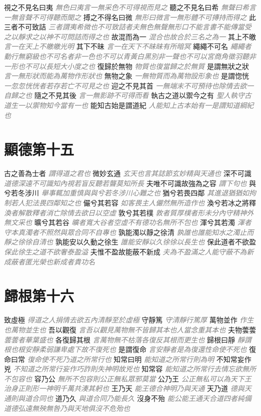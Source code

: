 \documentclass[a4paper,zihao=-4,oneside,landscape,UTF8]{ctexart}
\newcommand{\zhushi}[1]{\scriptsize{\textit{\textcolor{gray}{#1}}}\normalsize}
\begin{document}
視之不見名曰夷
\zhushi{無色曰夷言一無采色不可得視而見之}
聽之不見名曰希
\zhushi{無聲曰希言一無音聲不可得聽而聞之}
搏之不得名曰微
\zhushi{無形曰微言一無形體不可摶持而得之}
此三者不可致詰
\zhushi{三者謂夷希微也不可致詰者夫無色無聲無形口不能言書不能傳當受之以靜求之以神不可問詰而得之也}
故混而為一
\zhushi{混合也故合於三名之為一}
其上不皦
\zhushi{言一在天上不皦皦光明}
其下不昧
\zhushi{言一在天下不昧昧有所暗冥}
繩繩不可名
\zhushi{繩繩者動行無窮級也不可名者非一色也不可以青黃白黑別非一聲也不可以宮商角徵羽聽非一形也不可以長短大小度之也}
復歸於無物
\zhushi{物質也復當歸之於無質}
是謂無狀之狀
\zhushi{言一無形狀而能為萬物作形狀也}
無物之象
\zhushi{一無物質而為萬物設形象也}
是謂惚恍
\zhushi{一忽忽恍恍者若存若亡不可見之也}
迎之不見其首
\zhushi{一無端末不可預待也除情去欲一自歸之也}
隨之不見其後
\zhushi{言一無影跡不可得而看}
執古之道以禦今之有
\zhushi{聖人執守古道生一以禦物知今當有一也}
能知古始是謂道紀
\zhushi{人能知上古本始有一是謂知道綱紀也}


\section{顯德第十五}

古之善為士者
\zhushi{謂得道之君也}
微妙玄通
\zhushi{玄天也言其誌節玄妙精與天通也}
深不可識
\zhushi{道德深遠不可識知內視若盲反聽若聾莫知所長}
夫唯不可識故強為之容
\zhushi{謂下句也}
與兮若冬涉川
\zhushi{舉事輒加重慎與與兮若冬涉川心難之也}
猶兮若畏四鄰
\zhushi{其進退猶猶如拘制若人犯法畏四鄰知之也}
儼兮其若容
\zhushi{如客畏主人儼然無所造作也}
渙兮若冰之將釋
\zhushi{渙者解散釋者消亡除情去欲日以空虛}
敦兮其若樸
\zhushi{敦者質厚樸者形未分內守精神外無文采也}
曠兮其若谷
\zhushi{曠者寬大谷者空虛不有德功名無所不包也}
渾兮其若濁
\zhushi{渾者守本真濁者不照然與眾合同不自專也}
孰能濁以靜之徐清
\zhushi{孰誰也誰能知水之濁止而靜之徐徐自清也}
孰能安以久動之徐生
\zhushi{誰能安靜以久徐徐以長生也}
保此道者不欲盈
\zhushi{保此徐生之道不欲奢泰盈溢}
夫惟不盈故能蔽不新成
\zhushi{夫為不盈滿之人能守蔽不為新成蔽者匿光榮也新成者貴功名}


\section{歸根第十六}

致虛極
\zhushi{得道之人捐情去欲五內清靜至於虛極}
守靜篤
\zhushi{守清靜行篤厚}
萬物並作
\zhushi{作生也萬物並生也}
吾以觀復
\zhushi{言吾以觀見萬物無不皆歸其本也人當念重其本也}
夫物蕓蕓
\zhushi{蕓蕓者華葉盛也}
各復歸其根
\zhushi{言萬物無不枯落各復反其根而更生也}
歸根曰靜
\zhushi{靜謂根也根安靜柔弱謙卑處下故不復死也}
是謂復命
\zhushi{言安靜者是為復還性命使不死也}
復命曰常
\zhushi{復命使不死乃道之所常行也}
知常曰明
\zhushi{能知道之所常行則為明}
不知常妄作兇
\zhushi{不知道之所常行妄作巧詐則失神明故兇也}
知常容
\zhushi{能知道之所常行去情忘欲無所不包容也}
容乃公
\zhushi{無所不包容則公正無私眾邪莫當}
公乃王
\zhushi{公正無私可以為天下王治身正則形一神明千萬共湊其躬也}
王乃天
\zhushi{能王德合神明乃與天通}
天乃道
\zhushi{德與天通則與道合同也}
道乃久
\zhushi{與道合同乃能長久}
沒身不殆
\zhushi{能公能王通天合道四者純備道德弘遠無殃無咎乃與天地俱沒不危殆也}
\end{document}
